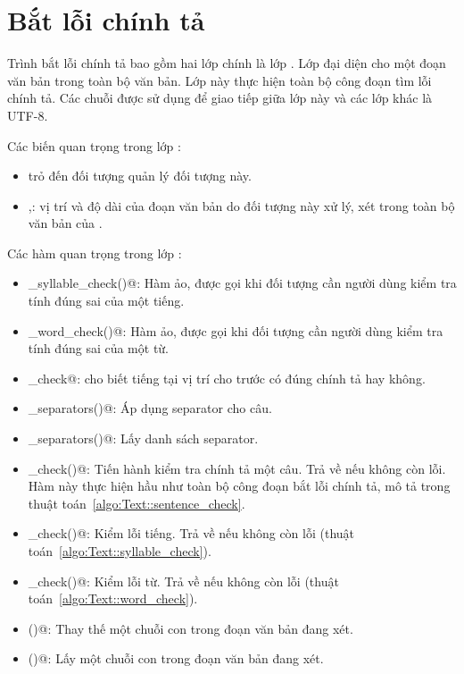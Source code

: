 \documentclass[a4paper,oneside,14pt]{extbook} %
\begin{document}
\section{Bắt lỗi chính tả}

Trình bắt lỗi chính tả bao gồm hai lớp chính là lớp \verb@Text@. Lớp
\verb@Text@ đại diện cho một đoạn văn bản trong toàn bộ văn bản. Lớp
này thực hiện toàn bộ công đoạn tìm lỗi chính tả. Các chuỗi được sử
dụng để giao tiếp giữa lớp này và các lớp khác là UTF-8.

Các biến quan trọng trong lớp \verb@Text@:
\begin{itemize}
\item \verb@vspell@ trỏ đến đối tượng \verb@VSpell@ quản lý đối tượng
  này.
\item \verb@offset@,\verb@length@: vị trí và độ dài của đoạn văn bản
  do đối tượng này xử lý, xét trong toàn bộ văn bản của \verb@vspell@.
\end{itemize}

Các hàm quan trọng trong lớp \verb@Text@:
\begin{itemize}
\item \verb@ui_syllable_check()@: Hàm ảo, được gọi khi đối tượng cần
  người dùng kiểm tra tính đúng sai của một tiếng.
\item \verb@ui_word_check()@: Hàm ảo, được gọi khi đối tượng cần người
  dùng kiểm tra tính đúng sai của một từ.
\item \verb@syllabel_check@: cho biết tiếng tại vị trí cho trước có
  đúng chính tả hay không.
\item \verb@apply_separators()@: Áp dụng separator cho câu.
\item \verb@get_separators()@: Lấy danh sách separator.
\item \verb@sentence_check()@: Tiến hành kiểm tra chính tả một
  câu. Trả về \verb@true@ nếu không còn lỗi. Hàm này thực hiện hầu như
  toàn bộ công đoạn bắt lỗi chính tả, mô tả trong thuật
  toán~\ref{algo:Text::sentence_check}.
\item \verb@syllable_check()@: Kiểm lỗi tiếng. Trả về \verb@true@ nếu
  không còn lỗi (thuật toán~\ref{algo:Text::syllable_check}).
\item \verb@word_check()@: Kiểm lỗi từ. Trả về \verb@true@ nếu
  không còn lỗi (thuật toán~\ref{algo:Text::word_check}).
\item \verb@replace()@: Thay thế một chuỗi con trong đoạn văn bản đang
  xét.
\item \verb@substr()@: Lấy một chuỗi con trong đoạn văn bản đang xét.
\end{itemize}
\end{document}
